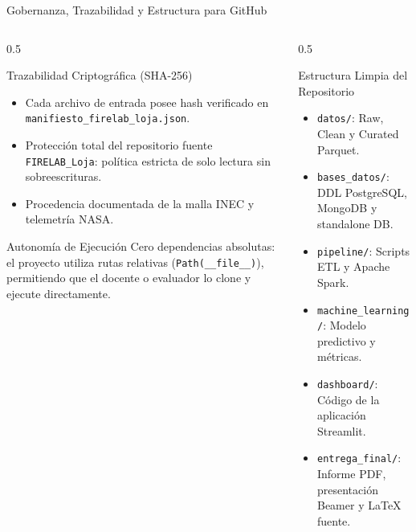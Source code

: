 \documentclass[aspectratio=169,11pt]{beamer}
\newcommand{\seccionactual}{Sustentaci\'on Final}
\begin{document}
\renewcommand{\seccionactual}{Gobernanza \& GitHub}
\begin{frame}{Gobernanza, Trazabilidad y Estructura para GitHub}
  \begin{columns}
    \begin{column}{0.5\textwidth}
      \begin{block}{Trazabilidad Criptogr\'afica (SHA-256)}\scriptsize
        \begin{itemize}
          \item Cada archivo de entrada posee hash verificado en \texttt{manifiesto\_firelab\_loja.json}.
          \item Protecci\'on total del repositorio fuente \texttt{FIRELAB\_Loja}: pol\'itica estricta de solo lectura sin sobreescrituras.
          \item Procedencia documentada de la malla INEC y telemetr\'ia NASA.
        \end{itemize}
      \end{block}
      \begin{exampleblock}{Autonom\'ia de Ejecuci\'on}\scriptsize
        Cero dependencias absolutas: el proyecto utiliza rutas relativas (\texttt{Path(\_\_file\_\_)}), permitiendo que el docente o evaluador lo clone y ejecute directamente.
      \end{exampleblock}
    \end{column}
    \begin{column}{0.5\textwidth}
      \begin{block}{Estructura Limpia del Repositorio}\scriptsize
        \begin{itemize}
          \item \texttt{datos/}: Raw, Clean y Curated Parquet.
          \item \texttt{bases\_datos/}: DDL PostgreSQL, MongoDB y standalone DB.
          \item \texttt{pipeline/}: Scripts ETL y Apache Spark.
          \item \texttt{machine\_learning/}: Modelo predictivo y m\'etricas.
          \item \texttt{dashboard/}: C\'odigo de la aplicaci\'on Streamlit.
          \item \texttt{entrega\_final/}: Informe PDF, presentaci\'on Beamer y LaTeX fuente.
        \end{itemize}
      \end{block}
    \end{column}
  \end{columns}
\end{frame}
\end{document}
